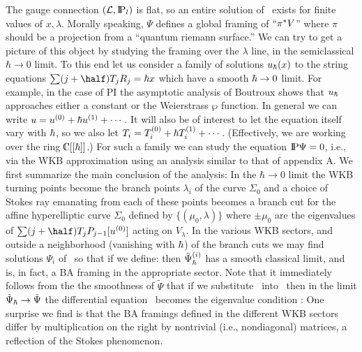 The gauge connection $({\cal L},\relax{\rm I\kern-.18em P}_l)$ is flat, so an entire
solution of \compa\ exists for finite values of $x,\lambda$. 
Morally speaking, $\Psi$ defines a global framing of $``\pi^*V$''
where $\pi$ should be a projection from a ``quantum riemann surface.''
We can try to get a picture
of this object by studying the framing over the $\lambda$ line, in 
the semiclassical $\hbar\to 0$ limit. To this end let us 
consider a family of solutions
$u_\hbar(x)$ to the string equations $\sum(j+\half)T_jR_j=\hb x$ 
which have a smooth $\hbar\to 0$ limit. For example, in the case
of PI the 
asymptotic analysis of Boutroux shows that $u_\hbar$ approaches
either a constant or the Weierstrass $\wp$ function.
In general we can write $u=u^{(0)}+\hbar u^{(1)}+\cdots$. 
It will also be of interest to let the equation itself
vary with $\hbar$, so we also let 
$T_i=T_i^{(0)} + \hbar T_i^{(1)} + \cdots$. 
(Effectively, we 
are working over the ring $\IC[[\hb]]$.)
For such a family 
we can study the equation $\relax{\rm I\kern-.18em P}\Psi=0$, i.e.,
\eqn{} 
via the WKB approximation using an analysis similar to that 
of appendix A. 
We first summarize the main conclusion of the analysis:
In the $\hbar\to 0$ limit the WKB turning 
points become the branch points $\lambda_i$
of the curve $\Sigma_0$ and a choice of Stokes ray emanating from 
each of these points becomes a branch cut for the affine hyperelliptic
curve $\Sigma_0$ defined by $\{(\mu_0,\lambda)\}$
where $\pm\mu_0$ 
are the eigenvalues of $\sum(j+\half)T_jP_{j-1}[u^{(0)}]$
acting on $V_\lambda$. 
In the various WKB sectors, and outside a neighborhood
(vanishing with $\hbar$) of the branch cuts we may find 
solutions $\Psi_i$ of \compa\ so that if we define:
\eqn{}
then $\tilde\Psi^{(i)}_\hbar$
has a smooth classical limit, and is, in fact, a BA framing 
in the appropriate sector. 
Note that it immediately follows from the the smoothness of
$\tilde\Psi$ that if we 
substitute \classbak\ into \wkay\ then in 
the limit $\tilde\Psi_\hbar\to\tilde\Psi$
the differential equation \wkay\ becomes the eigenvalue condition \bkfrm :
\eqn{}
One surprise we find is that the BA framings defined in the 
different WKB sectors differ by multiplication on the right 
by nontrivial (i.e., nondiagonal) matrices, a reflection
of the Stokes phenomenon. 
